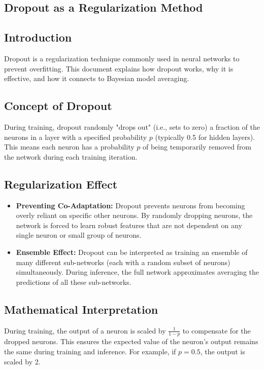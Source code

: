 \begin{notechapter}
\chapter{Dropout as a Regularization Method}\label{ch:dropout-regularization}

\section{Introduction}
Dropout is a regularization technique commonly used in neural 
networks to prevent overfitting. This document explains how 
dropout works, why it is effective, and how it connects to 
Bayesian model averaging.

\section{Concept of Dropout}
During training, dropout randomly "drops out" (i.e., sets to 
zero) a fraction of the neurons in a layer with a specified 
probability \( p \) (typically 0.5 for hidden layers). This 
means each neuron has a probability \( p \) of being 
temporarily removed from the network during each training 
iteration.

\section{Regularization Effect}
\begin{itemize}
    \item \textbf{Preventing Co-Adaptation:} Dropout prevents 
    neurons from becoming overly reliant on specific other 
    neurons. By randomly dropping neurons, the network is 
    forced to learn robust features that are not dependent on 
    any single neuron or small group of neurons.
    
    \item \textbf{Ensemble Effect:} Dropout can be interpreted 
    as training an ensemble of many different sub-networks 
    (each with a random subset of neurons) simultaneously. 
    During inference, the full network approximates averaging 
    the predictions of all these sub-networks.
\end{itemize}

\section{Mathematical Interpretation}
During training, the output of a neuron is scaled by 
\(\frac{1}{1-p}\) to compensate for the dropped neurons. This 
ensures the expected value of the neuron's output remains the 
same during training and inference. For example, if \( p = 0.5 
\), the output is scaled by 2.


\end{notechapter}

